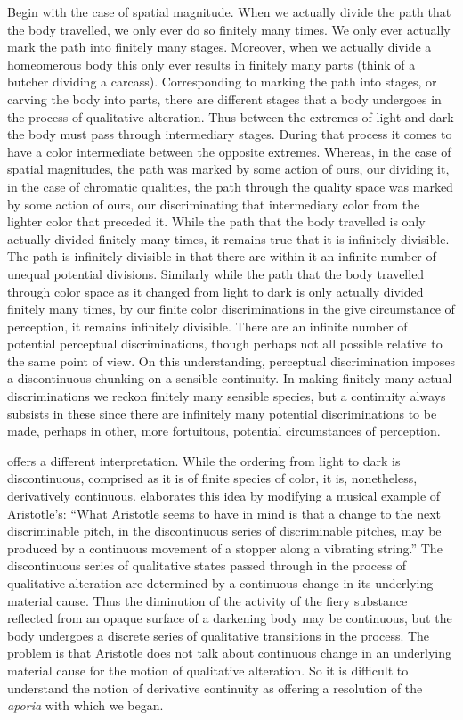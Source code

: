 Begin with the case of spatial magnitude. When we actually divide the path that the body travelled, we only ever do so finitely many times. We only ever actually mark the path into finitely many stages. Moreover, when we actually divide a homeomerous body this only ever results in finitely many parts (think of a butcher dividing a carcass). Corresponding to marking the path into stages, or carving the body into parts, there are different stages that a body undergoes in the process of qualitative alteration. Thus between the extremes of light and dark the body must pass through intermediary stages. During that process it comes to have a color intermediate between the opposite extremes. Whereas, in the case of spatial magnitudes, the path was marked by some action of ours, our dividing it, in the case of chromatic qualities, the path through the quality space was marked by some action of ours, our discriminating that intermediary color from the lighter color that preceded it. While the path that the body travelled is only actually divided finitely many times, it remains true that it is infinitely divisible. The path is infinitely divisible in that there are within it an infinite number of unequal potential divisions. Similarly while the path that the body travelled through color space as it changed from light to dark is only actually divided finitely many times, by our finite color discriminations in the give circumstance of perception, it remains infinitely divisible. There are an infinite number of potential perceptual discriminations, though perhaps not all possible relative to the same point of view. On this understanding, perceptual discrimination imposes a discontinuous chunking on a sensible continuity. In making finitely many actual discriminations we reckon finitely many sensible species, but a continuity always subsists in these since there are infinitely many potential discriminations to be made, perhaps in other, more fortuitous, potential circumstances of perception.

\citet[]{Sorabji:1976fk} offers a different interpretation. While the ordering from light to dark is discontinuous, comprised as it is of finite species of color, it is, nonetheless, derivatively continuous. \citet[80]{Sorabji:1976fk} elaborates this idea by modifying a musical example of Aristotle's: ``What Aristotle seems to have in mind is that a change to the next discriminable pitch, in the discontinuous series of discriminable pitches, may be produced by a continuous movement of a stopper along a vibrating string.'' The discontinuous series of qualitative states passed through in the process of qualitative alteration are determined by a continuous change in its underlying material cause. Thus the diminution of the activity of the fiery substance reflected from an opaque surface of a darkening body may be continuous, but the body undergoes a discrete series of qualitative transitions in the process. The problem is that Aristotle does not talk about continuous change in an underlying material cause for the motion of qualitative alteration. So it is difficult to understand the notion of derivative continuity as offering a resolution of the \emph{aporia} with which we began.

